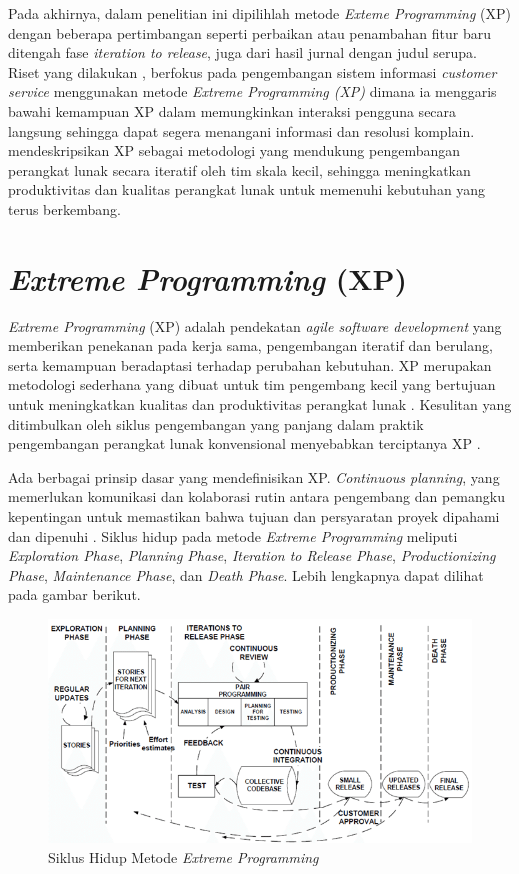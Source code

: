 Pada akhirnya, dalam penelitian ini dipilihlah metode \textit{Exteme Programming} (XP) dengan beberapa pertimbangan seperti perbaikan atau penambahan fitur baru ditengah fase \textit{iteration to release}, juga dari hasil jurnal dengan judul serupa. Riset yang dilakukan \textcite{article:rumandan}, berfokus pada pengembangan sistem informasi \textit{
customer service} menggunakan metode \textit{Extreme Programming (XP)} dimana ia menggaris bawahi kemampuan XP dalam memungkinkan interaksi pengguna secara langsung sehingga dapat segera menangani informasi dan resolusi komplain. \textcite{article:matharu} mendeskripsikan XP sebagai metodologi yang mendukung pengembangan perangkat lunak secara iteratif oleh tim skala kecil, sehingga meningkatkan produktivitas dan kualitas perangkat lunak untuk memenuhi kebutuhan yang terus berkembang.

\section{\textit{Extreme Programming} (XP)}

\textit{Extreme Programming} (XP) adalah pendekatan \textit{agile software development} yang memberikan penekanan pada kerja sama, pengembangan iteratif dan berulang, serta kemampuan beradaptasi terhadap perubahan kebutuhan. XP merupakan metodologi sederhana yang dibuat untuk tim pengembang kecil yang bertujuan untuk meningkatkan kualitas dan produktivitas perangkat lunak \parencite{article:matharu}. Kesulitan yang ditimbulkan oleh siklus pengembangan yang panjang dalam praktik pengembangan perangkat lunak konvensional menyebabkan terciptanya XP \parencite{article:rao}.

Ada berbagai prinsip dasar yang mendefinisikan XP. \textit{Continuous planning}, yang memerlukan komunikasi dan kolaborasi rutin antara pengembang dan pemangku kepentingan untuk memastikan bahwa tujuan dan persyaratan proyek dipahami dan dipenuhi \parencite{article:matharu}. Siklus hidup pada metode \textit{Extreme Programming} meliputi \textit{Exploration Phase}, \textit{Planning Phase}, \textit{Iteration to Release Phase}, \textit{Productionizing Phase}, \textit{Maintenance Phase}, dan \textit{Death Phase}. Lebih lengkapnya dapat dilihat pada gambar berikut.

\begin{figure}[ht]
    \includegraphics[width=1\linewidth, center]{images/tinjauan-pustaka/fig-xp-lifecycle.png}
    \caption{Siklus Hidup Metode \textit{Extreme Programming} \parencite{article:anwer}}
    \label{fig:xp-lifecycle}
\end{figure}

